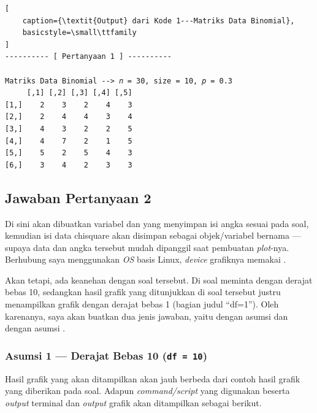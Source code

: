 \begin{lstlisting}[
    caption={\textit{Output} dari Kode 1---Matriks Data Binomial}, 
    basicstyle=\small\ttfamily
]
---------- [ Pertanyaan 1 ] ----------

Matriks Data Binomial --> 𝑛 = 30, size = 10, 𝑝 = 0.3
     [,1] [,2] [,3] [,4] [,5]
[1,]    2    3    2    4    3
[2,]    2    4    4    3    4
[3,]    4    3    2    2    5
[4,]    4    7    2    1    5
[5,]    5    2    5    4    3
[6,]    3    4    2    3    3
\end{lstlisting}

\subsection{Jawaban Pertanyaan 2}

Di sini akan dibuatkan variabel  dan  yang menyimpan isi angka sesuai pada soal, kemudian isi data chisquare akan disimpan sebagai objek/variabel bernama  --- supaya data dan angka tersebut mudah dipanggil saat pembuatan \textit{plot}-nya. Berhubung saya menggunakan \textit{OS} basis Linux, \textit{device} grafiknya memakai .

Akan tetapi, ada keanehan dengan soal tersebut. Di soal meminta dengan derajat bebas 10, sedangkan hasil grafik yang ditunjukkan di soal tersebut justru menampilkan grafik dengan derajat bebas 1 (bagian judul “df=1”). Oleh karenanya, saya akan buatkan dua jenis jawaban, yaitu dengan asumsi    dan dengan asumsi  .

\subsubsection{Asumsi 1 --- Derajat Bebas 10 (\texttt{df = 10})}

Hasil grafik yang akan ditampilkan akan jauh berbeda dari contoh hasil grafik yang diberikan pada soal. Adapun \textit{command/script} yang digunakan beserta \textit{output} terminal dan \textit{output} grafik akan ditampilkan sebagai berikut.

